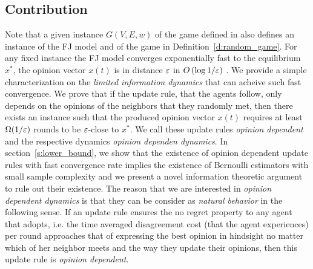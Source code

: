 %

\subsection{Contribution}
Note that a given instance $G(V,E,w)$ of the game defined in
\cite{BKO11} also defines an instance of the FJ model and of the 
game in Definition~\ref{d:random_game}. For any fixed instance 
the FJ model converges exponentially fast to the equilibrium $x^*$, 
the opinion vector $x(t)$ is in distance $\varepsilon$ in $O\left(\log 1/\varepsilon\right)$ \cite{GS14}. 
We provide a simple characterization on the \emph{limited information dynamics} 
that can acheive such fast convergence. We prove that if the update
rule, that the agents follow, only depends on the opinions of the neighbors
that they randomly met, then there exists an instance such that
the produced opinion vector $x(t)$ requires at least $\Omega(1/\varepsilon)$
rounds to be $\varepsilon$-close to $x^*$. We call these update rules 
\emph{opinion dependent} and the respective dynamics 
\emph{opinion dependen dynamics}. In section~\ref{s:lower_bound}, we show that
the existence of opinion dependent update rules with fast convergence rate
implies the existence of Bernoulli estimators with small sample complexity
and we present a novel information theoretic argument to rule out their
existence. The reason that we are interested in \emph{opinion dependent dynamics}
is that they can be consider as \emph{natural behavior} in the following
sense. If an update rule ensures the no regret property to any agent that adopts, 
i.e. the time averaged disagreement cost (that the agent experiences) per round
approaches that of expressing the best opinion in hindsight no matter
which of her neighbor meets and the way they update their opinions,
then this update rule is \emph{opinion dependent}.

